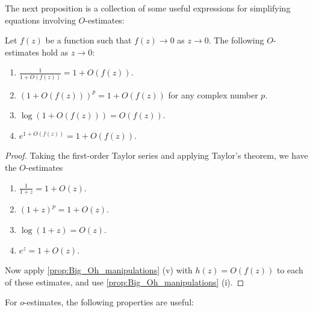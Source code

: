         The next proposition is a collection of some useful expressions for simplifying equations involving $O$-estimates:

        \begin{proposition}
          Let $f(z)$ be a function such that $f(z) \to 0$ as $z \to 0$. The following $O$-estimates hold as $z \to 0$:
          \begin{enumerate}[label=(\roman*)]
            \item $\frac{1}{1+O(f(z))} = 1+O(f(z))$.
            \item $(1+O(f(z)))^{p} = 1+O(f(z))$ for any complex number $p$.
            \item $\log(1+O(f(z))) = O(f(z))$.
            \item $e^{1+O(f(z))} = 1+O(f(z))$.
          \end{enumerate}
        \end{proposition}
        \begin{proof}
          Taking the first-order Taylor series and applying Taylor's theorem, we have the $O$-estimates
          \begin{enumerate}[label=(\roman*)]
            \item $\frac{1}{1+z} = 1+O(z)$.
            \item $(1+z)^{p} = 1+O(z)$.
            \item $\log(1+z) = O(z)$.
            \item $e^{z} = 1+O(z)$.
          \end{enumerate}
          Now apply \cref{prop:Big_Oh_manipulations} (v) with $h(z) = O(f(z))$ to each of these estimates, and use \cref{prop:Big_Oh_manipulations} (i).
        \end{proof}

        For $o$-estimates, the following properties are useful:


